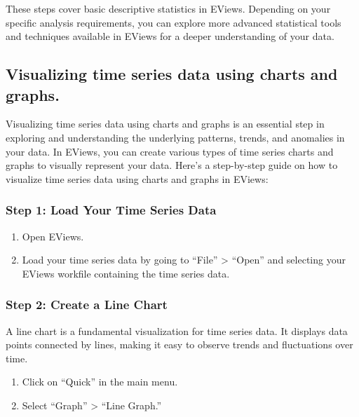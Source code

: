 \documentclass[
  letterpaper,
  DIV=11,
  numbers=noendperiod]{scrartcl}
\begin{document}
These steps cover basic descriptive statistics in EViews. Depending on
your specific analysis requirements, you can explore more advanced
statistical tools and techniques available in EViews for a deeper
understanding of your data.

\hypertarget{visualizing-time-series-data-using-charts-and-graphs.}{%
\subsection{Visualizing time series data using charts and
graphs.}\label{visualizing-time-series-data-using-charts-and-graphs.}}

Visualizing time series data using charts and graphs is an essential
step in exploring and understanding the underlying patterns, trends, and
anomalies in your data. In EViews, you can create various types of time
series charts and graphs to visually represent your data. Here's a
step-by-step guide on how to visualize time series data using charts and
graphs in EViews:

\hypertarget{step-1-load-your-time-series-data}{%
\subsubsection{\texorpdfstring{\textbf{Step 1: Load Your Time Series
Data}}{Step 1: Load Your Time Series Data}}\label{step-1-load-your-time-series-data}}

\begin{enumerate}
\def\labelenumi{\arabic{enumi}.}
\item
  Open EViews.
\item
  Load your time series data by going to ``File'' \textgreater{}
  ``Open'' and selecting your EViews workfile containing the time series
  data.
\end{enumerate}

\hypertarget{step-2-create-a-line-chart}{%
\subsubsection{\texorpdfstring{\textbf{Step 2: Create a Line
Chart}}{Step 2: Create a Line Chart}}\label{step-2-create-a-line-chart}}

A line chart is a fundamental visualization for time series data. It
displays data points connected by lines, making it easy to observe
trends and fluctuations over time.

\begin{enumerate}
\def\labelenumi{\arabic{enumi}.}
\item
  Click on ``Quick'' in the main menu.
\item
  Select ``Graph'' \textgreater{} ``Line Graph.''
\end{enumerate}
\end{document}
